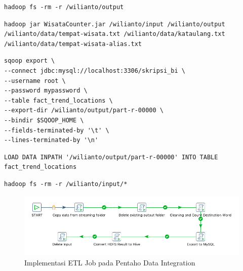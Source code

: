 \begin{lstlisting}[basicstyle=\tiny,caption=Menghapus folder output yang sudah ada]
hadoop fs -rm -r /wilianto/output
\end{lstlisting}

\begin{lstlisting}[basicstyle=\tiny,caption=Menjalankan program MapReduce untuk pembersihan data dan menghitung frekuensi kemunculan lokasi wisata]
hadoop jar WisataCounter.jar /wilianto/input /wilianto/output /wilianto/data/tempat-wisata.txt /wilianto/data/kataulang.txt /wilianto/data/tempat-wisata-alias.txt
\end{lstlisting}

\begin{lstlisting}[basicstyle=\tiny,caption=Mengekspor data dari output program MapReduce ke dalam table data warehouse di MySQL]
sqoop export \
--connect jdbc:mysql://localhost:3306/skripsi_bi \
--username root \
--password mypassword \
--table fact_trend_locations \
--export-dir /wilianto/output/part-r-00000 \
--bindir $SQOOP_HOME \
--fields-terminated-by '\t' \
--lines-terminated-by '\n'
\end{lstlisting}

\begin{lstlisting}[basicstyle=\tiny,caption=Mengkonversi hasil output dari program MapReduce ke dalam tabel data warehouse di Hive]
LOAD DATA INPATH '/wilianto/output/part-r-00000' INTO TABLE fact_trend_locations
\end{lstlisting}

\begin{lstlisting}[basicstyle=\tiny,caption=Hapus isi dari folder input]
hadoop fs -rm -r /wilianto/input/*
\end{lstlisting}

\begin{figure}[H]
	\centering
	\includegraphics[scale=0.5]{Gambar/ui-implementation-pentaho-di.png}
	\caption[Implementasi ETL Job pada Pentaho Data Integration]{Implementasi ETL Job pada Pentaho Data Integration} 
	\label{fig:ui_implementation_pentaho_di}
\end{figure}

